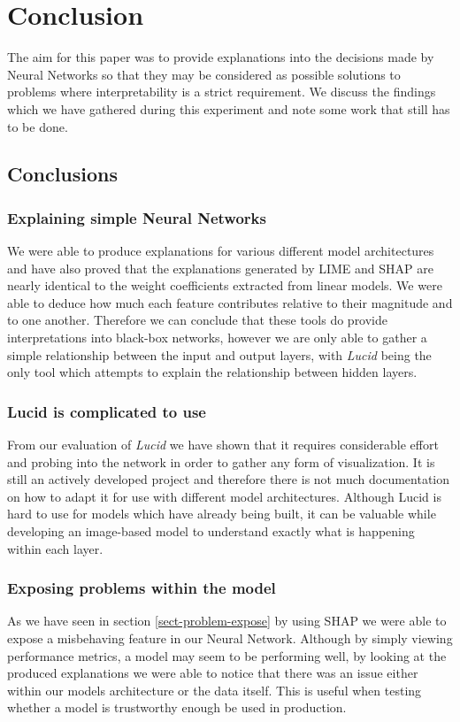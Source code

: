 \chapter{Conclusion}
The aim for this paper was to provide explanations into the decisions made by Neural Networks so that they may be considered as possible solutions to problems where interpretability is a strict requirement. We discuss the findings which we have gathered during this experiment and note some work that still has to be done.
\section{Conclusions}
\subsection{Explaining simple Neural Networks}
We were able to produce explanations for various different model architectures and have also proved that the explanations generated by LIME and SHAP are nearly identical to the weight coefficients extracted from linear models. We were able to deduce how much each feature contributes relative to their magnitude and to one another. Therefore we can conclude that these tools do provide interpretations into black-box networks, however we are only able to gather a simple relationship between the input and output layers, with \emph{Lucid} being the only tool which attempts to explain the relationship between hidden layers.
\subsection{Lucid is complicated to use}
From our evaluation of \emph{Lucid} we have shown that it requires considerable effort and probing into the network in order to gather any form of visualization. It is still an actively developed project and therefore there is not much documentation on how to adapt it for use with different model architectures. Although Lucid is hard to use for models which have already being built, it can be valuable while developing an image-based model to understand exactly what is happening within each layer.
\subsection{Exposing problems within the model}
As we have seen in section \ref{sect-problem-expose} by using SHAP we were able to expose a misbehaving feature in our Neural Network. Although by simply viewing performance metrics, a model may seem to be performing well, by looking at the produced explanations we were able to notice that there was an issue either within our models architecture or the data itself. This is useful when testing whether a model is trustworthy enough be used in production.
